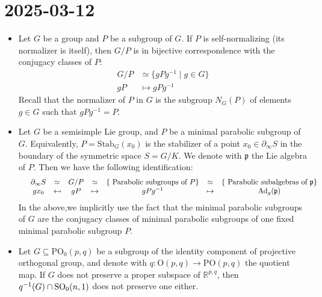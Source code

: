 \documentclass{report}
\begin{document}
\section{2025-03-12}
\begin{itemize}
    \item Let $G$ be a group and $P$ be a subgroup of $G$.
    If $P$ is self-normalizing (its normalizer is itself), then $G/P$ is in bijective correspondence with the conjugacy classes of $P$:
    \begin{align*}
        G/P &\simeq \{gPg^{-1} \mid g \in G\} \\
        gP &\mapsto gPg^{-1}
    \end{align*}
    Recall that the normalizer of $P$ in $G$ is the subgroup $N_G(P)$ of elements $g \in G$ such that $gPg^{-1} = P$.
    \item Let $G$ be a semisimple Lie group, and $P$ be a minimal parabolic subgroup of $G$.
    Equivalently, $P = \mathrm{Stab}_G(x_0)$ is the stabilizer of a point $x_0 \in \partial_\infty S$ in the boundary of the symmetric space $S = G/K$.
    We denote with $\mathfrak p$ the Lie algebra of $P$.
    Then we have the following identification:
    \[
    \begin{array}{cccccccc}
        &\partial_\infty S & \simeq & G/P & \simeq & \{\text{ Parabolic subgroups of } P\} &\simeq &\{\text{ Parabolic subalgebras of } \mathfrak p\} \\
        &g x_0 & \mapsfrom & gP & \mapsto &g P g^{-1} &\mapsto &\operatorname{Ad}_g (\mathfrak p)
    \end{array}
    \]
    In the above,we implicitly use the fact that the minimal parabolic subgroups of $G$ are the conjugacy classes of minimal parabolic subgroups of one fixed minimal parabolic subgroup $P$.
    \item Let $G \subseteq \mathrm{PO}_0(p,q)$ be a subgroup of the identity component of projective orthogonal group, and denote with $q: \mathrm{O}(p,q) \to \mathrm{PO}(p,q)$ the quotient map.
    If $G$ does not preserve a proper subspace of $\mathbb R^{p,q}$, then $q^{-1}(G) \cap \operatorname{{\mathrm{SO}}}_0(n,1)$ does not preserve one either.
    

\end{itemize}
\end{document}
